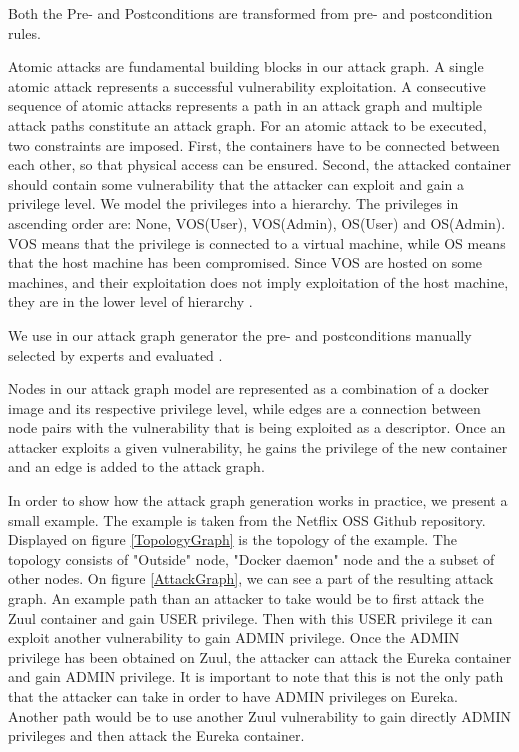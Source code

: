 Both the Pre- and Postconditions are transformed from pre- and postcondition rules. 

Atomic attacks are fundamental building blocks in our attack graph. A single atomic attack represents a successful vulnerability exploitation. A consecutive sequence of atomic attacks represents a path in an attack graph and multiple attack paths constitute an attack graph. For an atomic attack to be executed, two constraints are imposed. First, the containers have to be connected between each other, so that physical access can be ensured. Second, the attacked container should contain some vulnerability that the attacker can exploit and gain a privilege level. We model the privileges into a hierarchy. The privileges in ascending order are: None, VOS(User), VOS(Admin), OS(User) and OS(Admin). VOS means that the privilege is connected to a virtual machine, while OS means that the host machine has been compromised. Since VOS are hosted on some machines, and their exploitation does not imply exploitation of the host machine, they are in the lower level of hierarchy \cite{aksu2018automated}.

We use in our attack graph generator the pre- and postconditions manually selected by experts and evaluated \cite{aksu2018automated}.

Nodes in our attack graph model are represented as a combination of a docker image and its respective privilege level, while edges are a connection between node pairs with the vulnerability that is being exploited as a descriptor. Once an attacker exploits a given vulnerability, he gains the privilege of the new container and an edge is added to the attack graph.

In order to show how the attack graph generation works in practice, we present a small example. The example is taken from the Netflix OSS Github repository.\cite{netflixoss} Displayed on figure \ref{TopologyGraph} is the topology of the example. The topology consists of "Outside" node, "Docker daemon" node and the a subset of other nodes. On figure \ref{AttackGraph}, we can see a part of the resulting attack graph. An example path than an attacker to take would be to first attack the Zuul container and gain USER privilege. Then with this USER privilege it can exploit another vulnerability to gain ADMIN privilege. Once the ADMIN privilege has been obtained on Zuul, the attacker can attack the Eureka container and gain ADMIN privilege. It is important to note that this is not the only path that the attacker can take in order to have ADMIN privileges on Eureka. Another path would be to use another Zuul vulnerability to gain directly ADMIN privileges and then attack the Eureka container.

